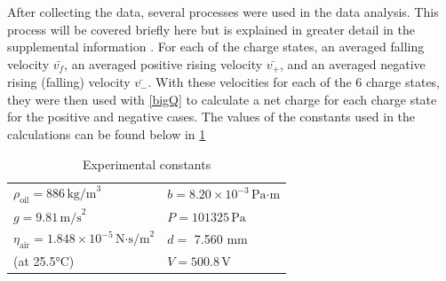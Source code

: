 \documentclass[%
 reprint,
 amsmath,amssymb,
 aps,
]{revtex4-2}
\begin{document}
After collecting the data, several processes were used in the data analysis. This process will be covered briefly here but is explained in greater detail in the supplemental information \cite{supp}. For each of the charge states, an averaged falling velocity $\bar{v_f}$, an averaged positive rising velocity $\bar{v_{+}}$, and an averaged negative rising (falling) velocity $\bar{v_-}$. With these velocities for each of the 6 charge states, they were then used with \eqref{bigQ} to calculate a net charge for each charge state for the positive and negative cases. The values of the constants used in the calculations can be found below in \ref{tab:constants}
\begin{table}[htbp]
\centering
\caption{Experimental constants}
\label{tab:constants}
\small
\begin{tabular}{ll}
\hline\hline
$\rho_{\text{oil}} = 886\,\text{kg/m}^3$ & $b = 8.20 \times 10^{-3}\,\text{Pa·m}$ \\
$g = 9.81\,\text{m/s}^2$ & $P = 101325\,\text{Pa}$ \\
$\eta_{\text{air}} = 1.848 \times 10^{-5}\,\text{N·s/m}^2$ & $d = $ 7.560 mm \\
(at 25.5°C) & $V = 500.8\,\text{V}$ \\
\hline\hline
\end{tabular}
\end{table}
\end{document}

